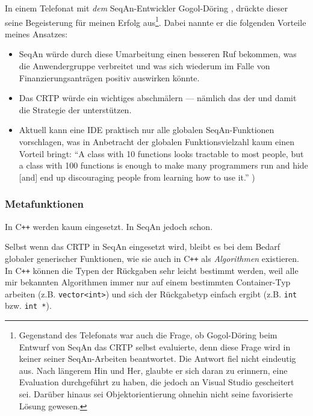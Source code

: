 \bigskip

In einem Telefonat mit \textit{dem} SeqAn-Entwickler Gogol-Döring \citep{GogolDoring:5iYhf2VJ}, drückte dieser seine Begeisterung für meinen Erfolg aus\footnote{Gegenstand des Telefonats war auch die Frage, ob Gogol-Döring beim Entwurf von SeqAn das CRTP selbst evaluierte, denn diese Frage wird in keiner seiner SeqAn-Arbeiten \citep{GogolDoring:2009vz,gogol2009biological} beantwortet. Die Antwort fiel nicht eindeutig aus. Nach längerem Hin und Her, glaubte er sich daran zu erinnern, eine Evaluation durchgeführt zu haben, die jedoch an Visual Studio gescheitert sei. Darüber hinaus sei Objektorientierung ohnehin nicht seine favorisierte Lösung gewesen.}. Dabei nannte er die folgenden Vorteile meines Ansatzes:
\begin{itemize}
  \item SeqAn würde durch diese Umarbeitung einen besseren Ruf bekommen, was die Anwendergruppe verbreitet und was sich wiederum im Falle von Finanzierungsanträgen positiv auswirken könnte.
  \item Das CRTP würde ein wichtiges  abschmälern --- nämlich das der  und damit die Strategie der  unterstützen.
  \item Aktuell kann eine IDE praktisch nur alle globalen SeqAn-Funktionen vorschlagen, was in Anbetracht der globalen Funktionsvielzahl kaum einen Vorteil bringt: ``A class with 10 functions looks tractable to most people, but a class with 100 functions is enough to make many programmers run and hide [and] end up discouraging people from learning how to use it.'' \citep{meyers1998effective})
\end{itemize}




\subsubsection{Metafunktionen}

In C\texttt{++} werden kaum  eingesetzt. In SeqAn jedoch schon.

Selbst wenn das CRTP in SeqAn eingesetzt wird, bleibt es bei dem Bedarf globaler generischer Funktionen, wie sie auch in C\texttt{++} als \textit{Algorithmen} existieren. In C\texttt{++} können die Typen der Rückgaben sehr leicht bestimmt werden, weil alle mir bekannten Algorithmen immer nur auf einem bestimmten Container-Typ arbeiten (z.B. \texttt{vector<int>}) und sich der Rückgabetyp einfach ergibt (z.B. \texttt{int} bzw. \texttt{int *}).

